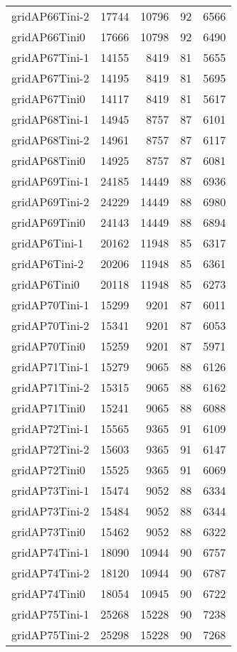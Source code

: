 \begin{longtable}{lrrrr}
gridAP66Tini-2 & 17744 & 10796 & 92 & 6566 \\
gridAP66Tini0 & 17666 & 10798 & 92 & 6490 \\
gridAP67Tini-1 & 14155 & 8419 & 81 & 5655 \\
gridAP67Tini-2 & 14195 & 8419 & 81 & 5695 \\
gridAP67Tini0 & 14117 & 8419 & 81 & 5617 \\
gridAP68Tini-1 & 14945 & 8757 & 87 & 6101 \\
gridAP68Tini-2 & 14961 & 8757 & 87 & 6117 \\
gridAP68Tini0 & 14925 & 8757 & 87 & 6081 \\
gridAP69Tini-1 & 24185 & 14449 & 88 & 6936 \\
gridAP69Tini-2 & 24229 & 14449 & 88 & 6980 \\
gridAP69Tini0 & 24143 & 14449 & 88 & 6894 \\
gridAP6Tini-1 & 20162 & 11948 & 85 & 6317 \\
gridAP6Tini-2 & 20206 & 11948 & 85 & 6361 \\
gridAP6Tini0 & 20118 & 11948 & 85 & 6273 \\
gridAP70Tini-1 & 15299 & 9201 & 87 & 6011 \\
gridAP70Tini-2 & 15341 & 9201 & 87 & 6053 \\
gridAP70Tini0 & 15259 & 9201 & 87 & 5971 \\
gridAP71Tini-1 & 15279 & 9065 & 88 & 6126 \\
gridAP71Tini-2 & 15315 & 9065 & 88 & 6162 \\
gridAP71Tini0 & 15241 & 9065 & 88 & 6088 \\
gridAP72Tini-1 & 15565 & 9365 & 91 & 6109 \\
gridAP72Tini-2 & 15603 & 9365 & 91 & 6147 \\
gridAP72Tini0 & 15525 & 9365 & 91 & 6069 \\
gridAP73Tini-1 & 15474 & 9052 & 88 & 6334 \\
gridAP73Tini-2 & 15484 & 9052 & 88 & 6344 \\
gridAP73Tini0 & 15462 & 9052 & 88 & 6322 \\
gridAP74Tini-1 & 18090 & 10944 & 90 & 6757 \\
gridAP74Tini-2 & 18120 & 10944 & 90 & 6787 \\
gridAP74Tini0 & 18054 & 10945 & 90 & 6722 \\
gridAP75Tini-1 & 25268 & 15228 & 90 & 7238 \\
gridAP75Tini-2 & 25298 & 15228 & 90 & 7268 \\

\end{longtable}
